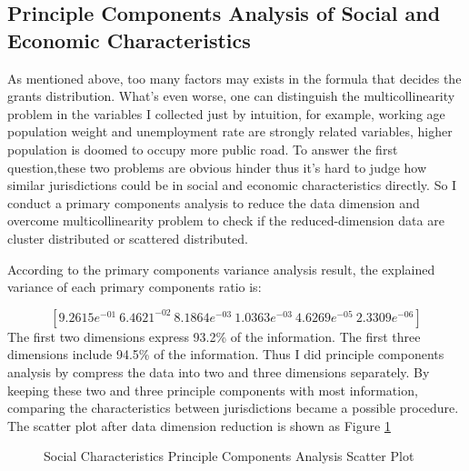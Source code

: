 \subsection{Principle Components Analysis of Social and Economic Characteristics}
As mentioned above, too many factors may exists in the formula that decides the grants distribution. What's even worse, one can distinguish the multicollinearity problem in the variables I collected just by intuition, for example, working age population weight and unemployment rate are strongly related variables, higher population is doomed to occupy more public road. To answer the first question,these two problems are obvious hinder thus it's hard to judge how similar jurisdictions could be in social and economic characteristics directly. So I conduct a primary components analysis to reduce the data dimension and overcome multicollinearity problem to check if the reduced-dimension data are cluster distributed or scattered distributed.

According to the primary components variance analysis result, the explained variance of each primary components ratio is:

$$[9.2615e^{-01}\ 6.4621^{-02}\ 8.1864e^{-03}\ 1.0363e^{-03}\ 4.6269e^{-05}\ 2.3309e^{-06}]$$
The first two dimensions express 93.2\% of the information. The first three dimensions include 94.5\% of the information. Thus I did principle components analysis by compress the data into two and three dimensions separately. By keeping these two and three principle components with most information, comparing the characteristics between jurisdictions became a possible procedure. The scatter plot after data dimension reduction is shown as Figure \ref*{Figure 2.2}


\begin{figure}[H]
    \centering  %
    \caption[Principle Components Analysis Scatter Plot]{Social Characteristics Principle Components Analysis Scatter Plot}    %
    \label{Figure 2.2}    %
\end{figure}

